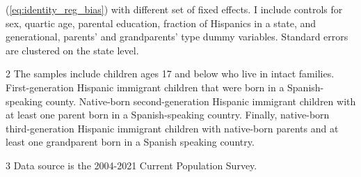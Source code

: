 \begin{table}[!h]
{\begin{threeparttable}
\begin{tablenotes}
{                      (\ref{eq:identity_reg_bias}) with different set of
                      fixed effects. I include controls for sex, quartic age, parental education, fraction of Hispanics in a state, and generational, parents' and grandparents' type dummy variables.
                      Standard errors are clustered on the state level.}
\item[2] \footnotesize{The samples include children ages 17 and below who live in intact families. 
                      First-generation Hispanic immigrant children that were born in a 
                      Spanish-speaking county. Native-born second-generation Hispanic 
                      immigrant children with at least one parent born in a Spanish-speaking 
                      country. Finally, native-born third-generation Hispanic immigrant children 
                      with native-born parents and at least one grandparent born in a Spanish 
                      speaking country.}
\item[3] \footnotesize{Data source is the 2004-2021 Current Population Survey.}
\end{tablenotes}
\end{threeparttable}}
\end{table}
